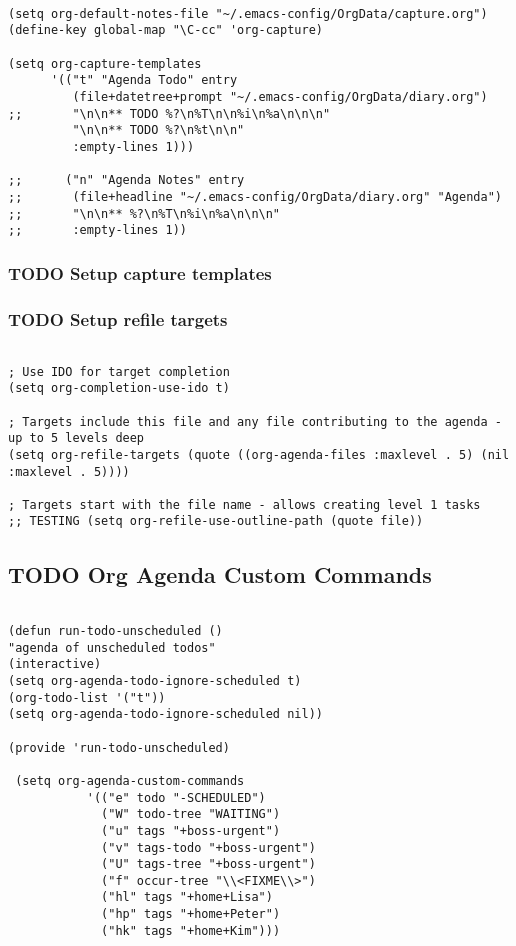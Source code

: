 \documentclass[colorlinks=true,urlcolor=blue,listings-sv]{article}
\begin{document}
\lstset{language=Lisp}
\begin{lstlisting}

(setq org-default-notes-file "~/.emacs-config/OrgData/capture.org")
(define-key global-map "\C-cc" 'org-capture)

(setq org-capture-templates
      '(("t" "Agenda Todo" entry
         (file+datetree+prompt "~/.emacs-config/OrgData/diary.org")
;;       "\n\n** TODO %?\n%T\n\n%i\n%a\n\n\n"
         "\n\n** TODO %?\n%t\n\n"
         :empty-lines 1)))

;;      ("n" "Agenda Notes" entry
;;       (file+headline "~/.emacs-config/OrgData/diary.org" "Agenda")
;;       "\n\n** %?\n%T\n%i\n%a\n\n\n"
;;       :empty-lines 1))
\end{lstlisting}
\subsubsection{\textbf{TODO} Setup capture templates}
\label{sec-2-20-2}
\subsubsection{\textbf{TODO} Setup refile targets}
\label{sec-2-20-3}



\lstset{language=Lisp}
\begin{lstlisting}

; Use IDO for target completion
(setq org-completion-use-ido t)

; Targets include this file and any file contributing to the agenda - up to 5 levels deep
(setq org-refile-targets (quote ((org-agenda-files :maxlevel . 5) (nil :maxlevel . 5))))

; Targets start with the file name - allows creating level 1 tasks
;; TESTING (setq org-refile-use-outline-path (quote file))
\end{lstlisting}
\subsection{\textbf{TODO} Org Agenda Custom Commands}
\label{sec-2-21}



\lstset{language=Lisp}
\begin{lstlisting}

(defun run-todo-unscheduled ()
"agenda of unscheduled todos"
(interactive)
(setq org-agenda-todo-ignore-scheduled t)
(org-todo-list '("t"))
(setq org-agenda-todo-ignore-scheduled nil))

(provide 'run-todo-unscheduled)

 (setq org-agenda-custom-commands
           '(("e" todo "-SCHEDULED")
             ("W" todo-tree "WAITING")
             ("u" tags "+boss-urgent")
             ("v" tags-todo "+boss-urgent")
             ("U" tags-tree "+boss-urgent")
             ("f" occur-tree "\\<FIXME\\>")
             ("hl" tags "+home+Lisa")
             ("hp" tags "+home+Peter")
             ("hk" tags "+home+Kim")))
\end{lstlisting}
\end{document}
